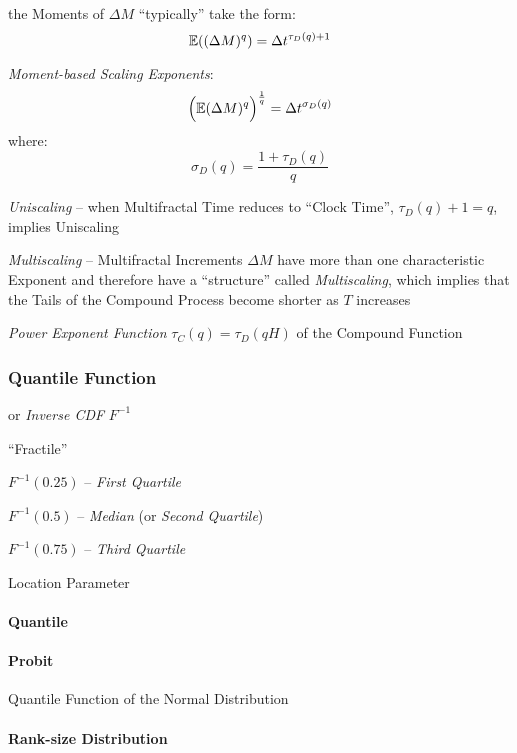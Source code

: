 the Moments of $\Delta M$ ``typically'' take the form:
\[
  \mathbb{E}((\Delta M)^q) = \Delta t^{\tau_D(q) + 1}
\]

\emph{Moment-based Scaling Exponents}:
\[
  \Big(\mathbb{E}(\Delta M)^q\Big)^\frac{1}{q} = \Delta t^{\sigma_D(q)}
\]
where:
\[
  \sigma_D(q) = \frac{1 + \tau_D(q)}{q}
\]

\emph{Uniscaling} -- when Multifractal Time reduces to ``Clock Time'',
$\tau_D(q) + 1 = q$, implies Uniscaling

\emph{Multiscaling} -- Multifractal Increments $\Delta M$ have more than one
characteristic Exponent and therefore have a ``structure'' called
\emph{Multiscaling}, which implies that the Tails of the Compound Process become
shorter as $T$ increases

\emph{Power Exponent Function} $\tau_C(q) = \tau_D(qH)$ of the Compound Function



\subsubsection{Quantile Function}\label{sec:quantile_function}

or \emph{Inverse CDF} $F^{-1}$

``Fractile''

$F^{-1}(0.25)$ -- \emph{First Quartile}

$F^{-1}(0.5)$ -- \emph{Median} (or \emph{Second Quartile})

$F^{-1}(0.75)$ -- \emph{Third Quartile}

Location Parameter



\paragraph{Quantile}\label{sec:quantile}\hfill

\paragraph{Probit}\label{sec:probit}\hfill

Quantile Function of the Normal Distribution



\paragraph{Rank-size Distribution}\label{sec:rank_size}\hfill

